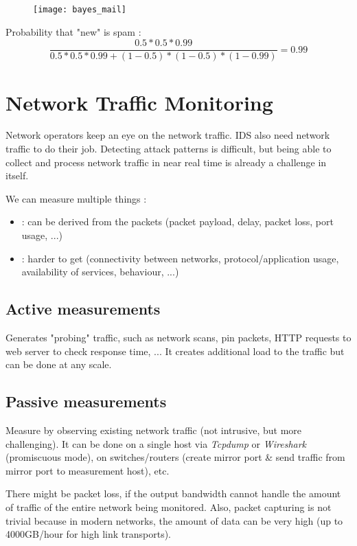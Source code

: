 \begin{figure}[H]
    \centering
    \texttt{[image: bayes\_mail]}
\end{figure}

Probability that "new" is spam :
\begin{equation*}
\frac{0.5 * 0.5 * 0.99}{0.5 * 0.5 * 0.99 + (1-0.5) * (1-0.5) * (1-0.99)} = 0.99
\end{equation*}

\chapter{Network Traffic Monitoring}

Network operators keep an eye on the network traffic. IDS also need network traffic to do their job. Detecting attack patterns is difficult, but being able to collect and process network traffic in near real time is already a challenge in itself.

We can measure multiple things :
\begin{itemize}
    \item {} : can be derived from the packets (packet payload, delay, packet loss, port usage, ...)
    \item {} : harder to get (connectivity between networks, protocol/application usage, availability of services, behaviour, ...)
\end{itemize}

\section{Active measurements}

Generates "probing" traffic, such as network scans, pin packets, HTTP requests to web server to check response time, ... It creates additional load to the traffic but can be done at any scale.

\section{Passive measurements}

Measure by observing existing network traffic (not intrusive, but more challenging). It can be done on a single host via \textit{Tcpdump} or \textit{Wireshark} (promiscuous mode), on switches/routers (create mirror port \& send traffic from mirror port to measurement host), etc.

There might be packet loss, if the output bandwidth cannot handle the amount of traffic of the entire network being monitored. Also, packet capturing is not trivial because in modern networks, the amount of data can be very high (up to 4000GB/hour for high link transports).


